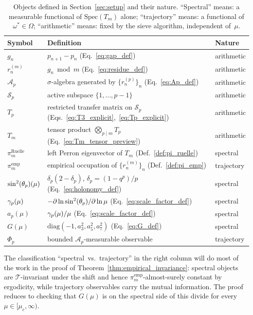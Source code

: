 \begin{table}[h]
\centering
\caption{Objects defined in Section~\ref{sec:setup} and their nature.
``Spectral'' means: a measurable functional of $\mathrm{Spec}(T_m)$
alone; ``trajectory'' means: a functional of $\omega^\ast \in \Omega$;
``arithmetic'' means: fixed by the sieve algorithm, independent
of~$\mu$.}
\label{tab:setup_glossary}
\renewcommand{\arraystretch}{1.15}
\begin{tabular}{@{}l l l@{}}
\toprule
Symbol & Definition & Nature \\
\midrule
$g_n$
 & $p_{n+1} - p_n$ (Eq.~\eqref{eq:gap_def})
 & arithmetic \\
$r_n^{(m)}$
 & $g_n \bmod m$ (Eq.~\eqref{eq:residue_def})
 & arithmetic \\
$\mathcal{A}_p$
 & $\sigma$-algebra generated by $\{r_n^{(p)}\}_n$ (Eq.~\eqref{eq:Ap_def})
 & arithmetic \\
$\mathcal{S}_p$
 & active subspace $\{1, \ldots, p-1\}$
 & arithmetic \\
$T_p$
 & restricted transfer matrix on $\mathcal{S}_p$
   (Eqs.~\eqref{eq:T3_explicit},~\eqref{eq:Tp_explicit})
 & arithmetic \\
$T_m$
 & tensor product $\bigotimes_{p \mid m} T_p$
   (Eq.~\eqref{eq:Tm_tensor_preview})
 & arithmetic \\
$\pi_m^{\mathrm{Ruelle}}$
 & left Perron eigenvector of $T_m$ (Def.~\ref{def:pi_ruelle})
 & spectral \\
$\pi_m^{\mathrm{emp}}$
 & empirical occupation of $\{r_n^{(m)}\}_n$ (Def.~\ref{def:pi_emp})
 & trajectory \\
$\sin^2(\theta_{p})(\mu)$
 & $\delta_p(2 - \delta_p)$, $\delta_p = (1 - q^p)/p$
   (Eq.~\eqref{eq:holonomy_def})
 & spectral \\
$\gamma_{p}(\mu)$
 & $-\partial \ln \sin^2(\theta_{p})/\partial \ln \mu$
   (Eq.~\eqref{eq:scale_factor_def})
 & spectral \\
$a_p(\mu)$
 & $\gamma_{p}(\mu)/\mu$ (Eq.~\eqref{eq:scale_factor_def})
 & spectral \\
$G(\mu)$
 & $\mathrm{diag}(-1, a_3^2, a_5^2, a_7^2)$ (Eq.~\eqref{eq:G_def})
 & spectral \\
$\Phi_p$
 & bounded $\mathcal{A}_p$-measurable observable
 & trajectory \\
\bottomrule
\end{tabular}
\end{table}

The classification ``spectral~vs.~trajectory'' in the right column will
do most of the work in the proof of
Theorem~\ref{thm:empirical_invariance}: spectral objects are
$\mathcal{T}$-invariant under the shift and hence
$\pi_m^{\mathrm{emp}}$-almost-surely constant by ergodicity, while
trajectory observables carry the mutual information. The proof reduces
to checking that $G(\mu)$ is on the spectral side of this divide for
every $\mu \in [\mu_c, \infty)$.
